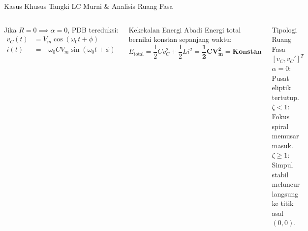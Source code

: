 \documentclass[aspectratio=169,10pt]{beamer}
\begin{document}
\begin{frame}{Kasus Khusus Tangki LC Murni \& Analisis Ruang Fasa}
  \begin{columns}[c]
    Jika $R = 0 \implies \alpha = 0$, PDB tereduksi:
    \begin{align*}
      v_C(t) &= V_m \cos(\omega_0 t + \phi) \\
      i(t) &= -\omega_0 C V_m \sin(\omega_0 t + \phi)
    \end{align*}
    \begin{alertblock}{Kekekalan Energi Abadi}
      Energi total bernilai konstan sepanjang waktu:
      \begin{equation*}
        E_{\text{total}} = \frac{1}{2} C v_C^2 + \frac{1}{2} L i^2 = \mathbf{\frac{1}{2} C V_m^2 = \text{Konstan}}
      \end{equation*}
    \end{alertblock}
    \begin{exampleblock}{Tipologi Ruang Fasa $[v_C, v_C']^T$}
      \tiny
      $\alpha = 0$: Pusat eliptik tertutup. $\zeta < 1$: Fokus spiral memusar masuk. $\zeta \ge 1$: Simpul stabil meluncur langsung ke titik asal $(0,0)$.
    \end{exampleblock}

    \begin{center}
    \end{center}
  \end{columns}
\end{frame}
\end{document}
